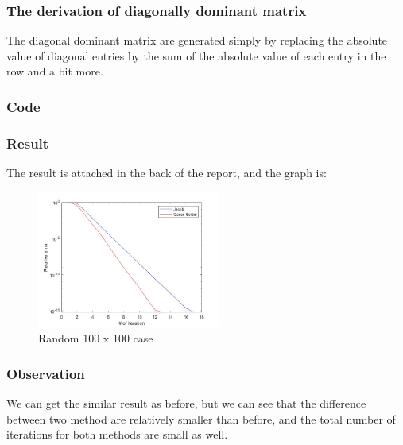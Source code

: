 \documentclass{article}
\begin{document}
\subsubsection{The derivation of diagonally dominant matrix}

The diagonal dominant matrix are generated simply by replacing the absolute value of diagonal entries by the sum of the absolute value of each entry in the row and a bit more.

\subsubsection{Code}


\subsubsection{Result}
The result is attached in the back of the report, and the graph is:

\begin{figure}[ht]
\centering
\caption {Random 100 x 100 case}
  \includegraphics[width=6cm]{randomcase.jpg}
  \end{figure} 
  \subsubsection{Observation}
  
We can get the similar result as before, but we can see that the difference between two method are relatively smaller than before, and the total number of iterations for both methods are small as well.
\end{document}
